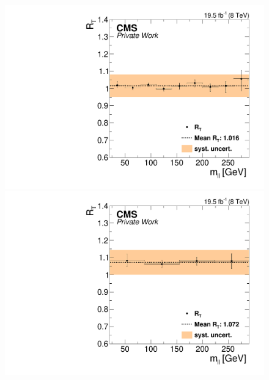 \begin{figure}[htbp]
\centering
\begin{minipage}[t]{0.49\textwidth}
  \includegraphics[width=\textwidth]{plots/BG/trigger/Triggereff_SFvsOF_Syst_AlphaT_HighHTExclusiveCentral_Full2012_Mll_None.pdf}
\end{minipage}
\begin{minipage}[t]{0.49\textwidth}
\includegraphics[width=\textwidth]{plots/BG/trigger/Triggereff_SFvsOF_Syst_AlphaT_HighHTExclusiveForward_Full2012_Mll_None.pdf}
\end{minipage}
\begin{minipage}[t]{0.49\textwidth}

\end{minipage}
\end{figure}

